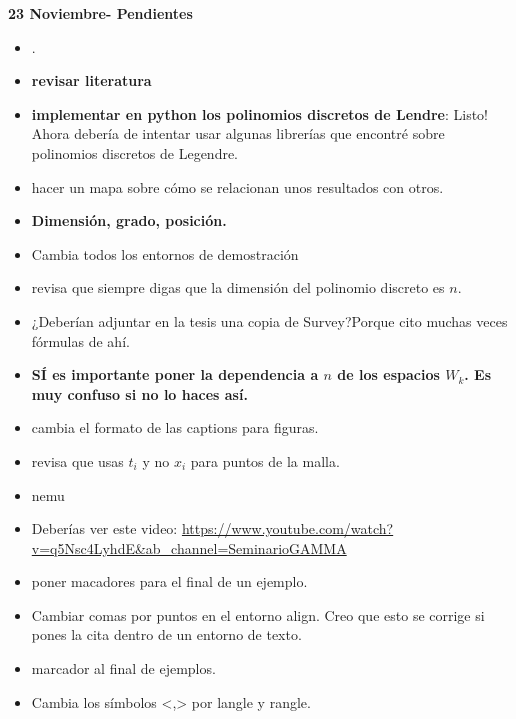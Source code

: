 \textbf{23 Noviembre- Pendientes}
\begin{itemize}

\item {}.

\item \textbf{revisar literatura}
\item \textbf{implementar en python los polinomios discretos de Lendre}: Listo!
Ahora debería de intentar usar algunas librerías que encontré
sobre polinomios discretos de Legendre.

\item hacer un mapa sobre cómo se relacionan unos
resultados con otros.
\item \textbf{Dimensión, grado, posición.}
\item Cambia todos los entornos de demostración

\item revisa que siempre digas que la dimensión
del polinomio discreto es $n$.

\item ¿Deberían adjuntar en la tesis una copia de Survey?Porque
cito muchas veces fórmulas de ahí.  

\item \textbf{SÍ es importante poner la dependencia a $n$ de los espacios
$W_{k}$. Es muy confuso si no lo haces así.}

\item cambia el formato de las captions para figuras.

\item revisa que usas $t_{i}$ y no $x_{i}$ para puntos
de la malla.

\item nemu

\item Deberías ver este video:  \url{https://www.youtube.com/watch?v=q5Nsc4LyhdE&ab_channel=SeminarioGAMMA}

\item poner macadores para el final de un ejemplo.

\item Cambiar comas por puntos en el entorno align. Creo que
esto se corrige si pones la cita dentro de un entorno
de texto.

\item marcador al final de ejemplos. \final

\item Cambia los símbolos <,> por langle y rangle.


\end{itemize}

